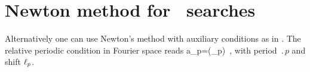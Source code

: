 

\section{Newton method  for \rpo\ searches}
\label{sec:NewtRPOs}

Alternatively one can use Newton's method with auxiliary conditions as in .
The relative periodic condition in Fourier space reads
\beq
    a_p=(\shift_p)  
\,,
    \label{eq:RPOcond}
\eeq
with period $\period{p}$ and shift $\ell_p$.

